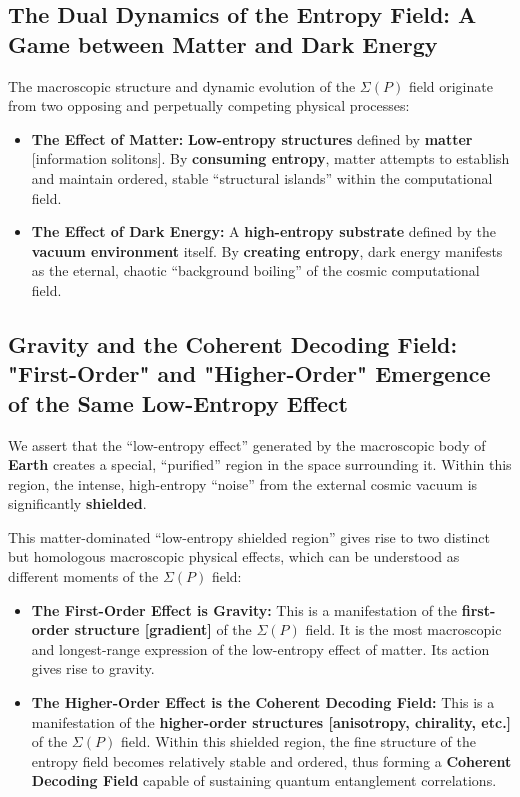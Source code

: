 \documentclass[11pt]{article}
\begin{document}
\subsection{The Dual Dynamics of the Entropy Field: A Game between Matter and Dark Energy}
The macroscopic structure and dynamic evolution of the $\Sigma(P)$ field originate from two opposing and perpetually competing physical processes:

\begin{itemize}
    \item   \textbf{The Effect of Matter:}
    \textbf{Low-entropy structures} defined by \textbf{matter} [information solitons]. By \textbf{consuming entropy}, matter attempts to establish and maintain ordered, stable ``structural islands'' within the computational field.

    \item   \textbf{The Effect of Dark Energy:}
    A \textbf{high-entropy substrate} defined by the \textbf{vacuum environment} itself. By \textbf{creating entropy}, dark energy manifests as the eternal, chaotic ``background boiling'' of the cosmic computational field.
\end{itemize}

\subsection{Gravity and the Coherent Decoding Field: "First-Order" and "Higher-Order" Emergence of the Same Low-Entropy Effect}
We assert that the ``low-entropy effect'' generated by the macroscopic body of \textbf{Earth} creates a special, ``purified'' region in the space surrounding it. Within this region, the intense, high-entropy ``noise'' from the external cosmic vacuum is significantly \textbf{shielded}.

This matter-dominated ``low-entropy shielded region'' gives rise to two distinct but homologous macroscopic physical effects, which can be understood as different moments of the $\Sigma(P)$ field:

\begin{itemize}
    \item   \textbf{The First-Order Effect is Gravity:}
    This is a manifestation of the \textbf{first-order structure [gradient]} of the $\Sigma(P)$ field. It is the most macroscopic and longest-range expression of the low-entropy effect of matter. Its action gives rise to gravity.

    \item   \textbf{The Higher-Order Effect is the Coherent Decoding Field:}
    This is a manifestation of the \textbf{higher-order structures [anisotropy, chirality, etc.]} of the $\Sigma(P)$ field. Within this shielded region, the fine structure of the entropy field becomes relatively stable and ordered, thus forming a \textbf{Coherent Decoding Field} capable of sustaining quantum entanglement correlations.
\end{itemize}
\end{document}
